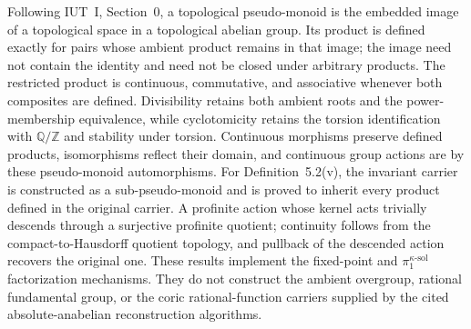 \begin{definition}
  \label{def:source-topological-pseudo-monoids}
  \leanok
  Following IUT~I, Section~0, a topological pseudo-monoid is the embedded
  image of a topological space in a topological abelian group.  Its product is
  defined exactly for pairs whose ambient product remains in that image; the
  image need not contain the identity and need not be closed under arbitrary
  products.  The restricted product is continuous, commutative, and
  associative whenever both composites are defined.  Divisibility retains
  both ambient roots and the power-membership equivalence, while
  cyclotomicity retains the torsion identification with \(\mathbb Q/\mathbb Z\)
  and stability under torsion.  Continuous morphisms preserve defined
  products, isomorphisms reflect their domain, and continuous group actions
  are by these pseudo-monoid automorphisms.  For Definition~5.2(v), the
  invariant carrier is constructed as a sub-pseudo-monoid and is proved to
  inherit every product defined in the original carrier.  A profinite action
  whose kernel acts trivially descends through a surjective profinite
  quotient; continuity follows from the compact-to-Hausdorff quotient
  topology, and pullback of the descended action recovers the original one.
  These results implement the fixed-point and
  $\pi_1^{\kappa\text{-sol}}$ factorization mechanisms.  They do not construct
  the ambient overgroup, rational fundamental group, or the coric
  rational-function carriers supplied by the cited absolute-anabelian
  reconstruction algorithms.
\end{definition}

